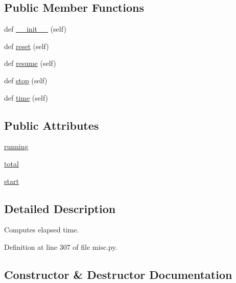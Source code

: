 \subsection*{Public Member Functions}
\begin{DoxyCompactItemize}
\item 
def \hyperlink{classparlai_1_1utils_1_1misc_1_1Timer_ae566c74592910671655a53eafaf8f92d}{\+\_\+\+\_\+init\+\_\+\+\_\+} (self)
\item 
def \hyperlink{classparlai_1_1utils_1_1misc_1_1Timer_a68bdf8abb3fe00edc639b21944d03371}{reset} (self)
\item 
def \hyperlink{classparlai_1_1utils_1_1misc_1_1Timer_a855f1e8a3ba03fe16712fd7ae49dab46}{resume} (self)
\item 
def \hyperlink{classparlai_1_1utils_1_1misc_1_1Timer_a5a7a90c124ef1b1b92a550606a3c93b9}{stop} (self)
\item 
def \hyperlink{classparlai_1_1utils_1_1misc_1_1Timer_a37214d0006ae44a19081c21a5a699ffb}{time} (self)
\end{DoxyCompactItemize}
\subsection*{Public Attributes}
\begin{DoxyCompactItemize}
\item 
\hyperlink{classparlai_1_1utils_1_1misc_1_1Timer_a05abf50b49c1e26baabe03a9daafa870}{running}
\item 
\hyperlink{classparlai_1_1utils_1_1misc_1_1Timer_a37214900a663640b33bdce9e6b3053dd}{total}
\item 
\hyperlink{classparlai_1_1utils_1_1misc_1_1Timer_a1c32e2a8785377c980bc4b125fe6db0d}{start}
\end{DoxyCompactItemize}


\subsection{Detailed Description}
\begin{DoxyVerb}Computes elapsed time.
\end{DoxyVerb}
 

Definition at line 307 of file misc.\+py.



\subsection{Constructor \& Destructor Documentation}
\mbox{\label{classparlai_1_1utils_1_1misc_1_1Timer_ae566c74592910671655a53eafaf8f92d}} 
